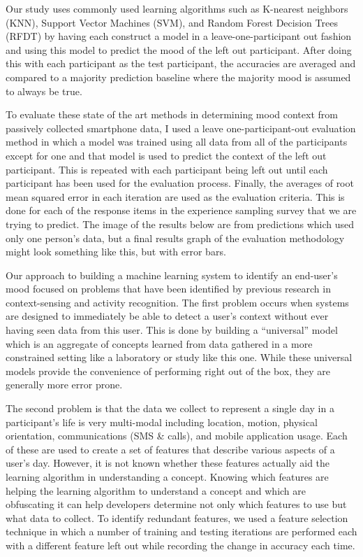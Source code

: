 Our study uses commonly used learning algorithms such as K-nearest neighbors (KNN), Support Vector Machines (SVM), and Random Forest Decision Trees (RFDT) by having each construct a model in a leave-one-participant out fashion and using this model to predict the mood of the left out participant.  After doing this with each participant as the test participant, the accuracies are averaged and compared to a majority prediction baseline where the majority mood is assumed to always be true.

To evaluate these state of the art methods in determining mood context from passively collected smartphone data, I used a leave one-participant-out evaluation method in which a model was trained using all data from all of the participants except for one and that model is used to predict the context of the left out participant.  This is repeated with each participant being left out until each participant has been used for the evaluation process.  Finally, the averages of root mean squared error in each iteration are used as the evaluation criteria.  This is done for each of the response items in the experience sampling survey that we are trying to predict.  The image of the results below are from predictions which used only one person’s data, but a final results graph of the evaluation methodology might look something like this, but with error bars.

Our approach to building a machine learning system to identify an end-user’s mood focused on problems that have been identified by previous research in context-sensing and activity recognition. The first problem occurs when systems are designed to immediately be able to detect a user’s context without ever having seen data from this user.  This is done by building a “universal” model which is an aggregate of concepts learned from data gathered in a more constrained setting like a laboratory or study like this one.  While these universal models provide the convenience of performing right out of the box, they are generally more error prone.

The second problem is that the data we collect to represent a single day in a participant’s life is very multi-modal including location, motion, physical orientation, communications (SMS \& calls), and mobile application usage.  Each of these are used to create a set of features that describe various aspects of a user’s day.  However, it is not known whether these features actually aid the learning algorithm in understanding a concept. Knowing which features are helping the learning algorithm to understand a concept and which are obfuscating it can help developers determine not only which features to use but what data to collect.  To identify redundant features, we used a feature selection technique in which a number of training and testing iterations are performed each with a different feature left out while recording the change in accuracy each time.